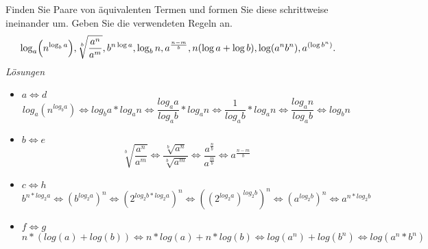 Finden Sie Paare von \"aquivalenten Termen und formen Sie diese
schrittweise ineinander um. Geben Sie die verwendeten Regeln an.
\[
 \log_a\Bigl(n^{\log_b a}\Bigr), \sqrt[b]{\frac{a^n}{a^m}},
 b^{n \log a}, \log_b n, a^{\frac{n-m}{b}}, n(\log a + \log b),
 \log(a^nb^n),a^{(\log b^n)}.
\]
{\itshape Lösungen}
\begin{itemize}
\item $a \Leftrightarrow d$ \\
	  \[
      log_{a}(n^{log_{b}a}) \Leftrightarrow log_{b}a * log_{a}n \Leftrightarrow \frac{log_{a}a}{log_{a}b} * log_{a}n \Leftrightarrow \frac{1}{log_{a}b} * log_{a}n \Leftrightarrow \frac{log_{a}n}{log_{a}b} \Leftrightarrow log_{b}n
      \]
\item $b \Leftrightarrow e$ \\
	  \[
       \sqrt[b]{\frac{a^n}{a^m}} \Leftrightarrow \frac{\sqrt[b]{a^n}}{\sqrt[b]{a^m}} \Leftrightarrow \frac{a^{\frac{n}{b}}}{a^{\frac{m}{b}}} \Leftrightarrow a^{\frac{n-m}{b}}
      \]
\item $c \Leftrightarrow h$ \\
	  \[
        b^{n*log_{2}a} \Leftrightarrow (b^{log_{2}a})^n \Leftrightarrow (2^{log_{2}b * log_{2}a})^n \Leftrightarrow ((2^{log_{2}a})^{log_{2}b})^n \Leftrightarrow (a^{log_{2}b})^n \Leftrightarrow a^{n * log_{2}b}
      \]
\item $ f \Leftrightarrow g$
      \[
       n*(log(a) + log(b)) \Leftrightarrow n * log(a) + n* log(b) \Leftrightarrow log(a^n) + log(b^n) \Leftrightarrow log(a^n*b^n)
      \]
\end{itemize}




